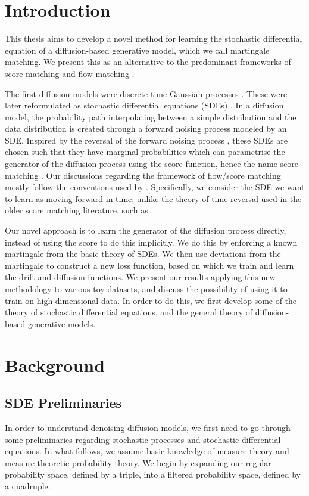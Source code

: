 \documentclass[12pt]{article}
\theoremstyle{break}
\begin{document}
\tableofcontents

\newpage

\section{Introduction}
This thesis aims to develop a novel method for learning the stochastic differential equation of a diffusion-based generative model, which we call martingale matching. We present this as an alternative to the predominant frameworks of score matching \cite{song2021} and flow matching \cite{lipman2023}.

The first diffusion models were discrete-time Gaussian processes \cite{sohldickstein2015, ho2020}. These were later reformulated as stochastic differential equations (SDEs) \cite{song2021}. In a diffusion model, the probability path interpolating between a simple distribution and the data distribution is created through a forward noising process modeled by an SDE. Inspired by the reversal of the forward noising process \cite{anderson1982}, these SDEs are chosen such that they have marginal probabilities which can parametrise the generator of the diffusion process using the score function, hence the name score matching \cite{song2020, lipman2024}. Our discussions regarding the framework of flow/score matching mostly follow the conventions used by \cite{lipman2024, holderrieth2026}. Specifically, we consider the SDE we want to learn as moving forward in time, unlike the theory of time-reversal used in the older score matching literature, such as \cite{song2021}.

Our novel approach is to learn the generator of the diffusion process directly, instead of using the score to do this implicitly. We do this by enforcing a known martingale from the basic theory of SDEs. We then use deviations from the martingale to construct a new loss function, based on which we train and learn the drift and diffusion functions. We present our results applying this new methodology to various toy datasets, and discuss the possibility of using it to train on high-dimensional data. In order to do this, we first develop some of the theory of stochastic differential equations, and the general theory of diffusion-based generative models.

\section{Background}
\subsection{SDE Preliminaries}
In order to understand denoising diffusion models, we first need to go through some preliminaries regarding stochastic processes and stochastic differential equations. In what follows, we assume basic knowledge of measure theory and measure-theoretic probability theory. We begin by expanding our regular probability space, defined by a triple, into a filtered probability space, defined by a quadruple.
\end{document}
